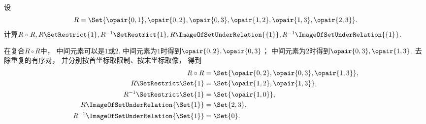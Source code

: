 \begin{example}
    设
    \begin{equation*}
        R = \Set{
        \opair{0,1},
        \opair{0,2},
        \opair{0,3},
        \opair{1,2},
        \opair{1,3},
        \opair{2,3}
        }.
    \end{equation*}
    计算\(R \circ R,
    R \SetRestrict \{1\},
    R^{-1} \SetRestrict \{1\},
    R\ImageOfSetUnderRelation{\{1\}},
    R^{-1}\ImageOfSetUnderRelation{\{1\}}\).
    \begin{solution}
        在复合\(R\circ R\)中，
        中间元素可以是\(1\)或\(2\).
        中间元素为\(1\)时得到\(\opair{0,2},\opair{0,3}\)；
        中间元素为\(2\)时得到\(\opair{0,3},\opair{1,3}\).
        去除重复的有序对，
        并分别按首坐标取限制、按末坐标取像，
        得到
        \begin{align*}
            R\circ R &=\Set{\opair{0,2},\opair{0,3},\opair{1,3}}, \\
            R\SetRestrict\Set{1} &=\Set{\opair{1,2},\opair{1,3}}, \\
            R^{-1}\SetRestrict\Set{1} &=\Set{\opair{1,0}}, \\
            R\ImageOfSetUnderRelation{\Set{1}} &=\Set{2,3}, \\
            R^{-1}\ImageOfSetUnderRelation{\Set{1}} &=\Set{0}.
        \end{align*}
    \end{solution}
\end{example}

